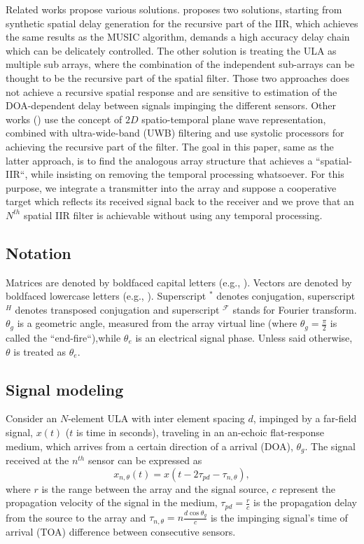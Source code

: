 Related works propose various solutions.
\cite{Wen2013ExtendingStructure} proposes two solutions, starting from synthetic spatial delay generation for the recursive part of the IIR, which achieves the same results as the MUSIC algorithm, demands a high accuracy delay chain which can be delicately controlled. The other solution is treating the ULA as multiple sub arrays, where the combination of the independent sub-arrays can be thought to be the recursive part of the spatial filter. Those two approaches does not achieve a recursive spatial response and are sensitive to estimation of the DOA-dependent delay between signals impinging the different sensors.
Other works (\cite{Madanayake2008AFilters,Madanayake2008ABeamformer}) use the concept of $2D$ spatio-temporal plane wave representation, combined with ultra-wide-band \cite{YangLiuqingandGiannakisUltra-widebandCome} (UWB) filtering and use systolic processors for achieving the recursive part of the filter.
The goal in this paper, same as the latter approach, is to find the analogous array structure that achieves a ``spatial-IIR``, while insisting on removing the temporal processing whatsoever. For this purpose, we integrate a transmitter into the array and suppose a cooperative target which reflects its received signal back to the receiver and we prove that an $N^{th}$ spatial IIR filter is achievable without using any temporal processing.
\subsection*{Notation}
Matrices are denoted by boldfaced capital letters (e.g., ). Vectors are denoted by boldfaced lowercase letters (e.g., ). Superscript $^{*}$ denotes conjugation, superscript $^{H}$ denotes transposed conjugation and superscript $^{\mathcal{F}}$ stands for Fourier transform. $\theta_{g}$ is a geometric angle, measured from the array virtual line (where $\theta_{g} = \frac{\pi}{2}$ is called the ``end-fire``),while $\theta_{e}$ is an electrical signal phase. Unless said otherwise, $\theta$ is treated as $\theta_{e}$.

\subsection*{Signal modeling}
Consider an $N$-element ULA with inter element spacing $d$, impinged by a far-field signal, $x\left(t\right)$ ($t$ is time in seconds), traveling in an an-echoic flat-response medium, which arrives from a certain direction of a arrival (DOA), $\theta_{g}$. The signal received at the $n^{th}$ sensor can be expressed as 
\begin{equation}
x_{n,\theta}(t) = x\left(t-2\tau_{pd}-\tau_{n,\theta}\right),
\label{eqn:noFeedbackULA_singleSensor_temporal}
\end{equation}
where $r$ is the range between the array and the signal source, $c$ represent the propagation velocity of the signal in the medium, $\tau_{pd} = \frac{r}{c}$ is the propagation delay from the source to the array and $\tau_{n,\theta} = n\frac{d\cos{\theta_{g}}}{c}$ is the impinging signal's time of arrival (TOA) difference between consecutive sensors. 
